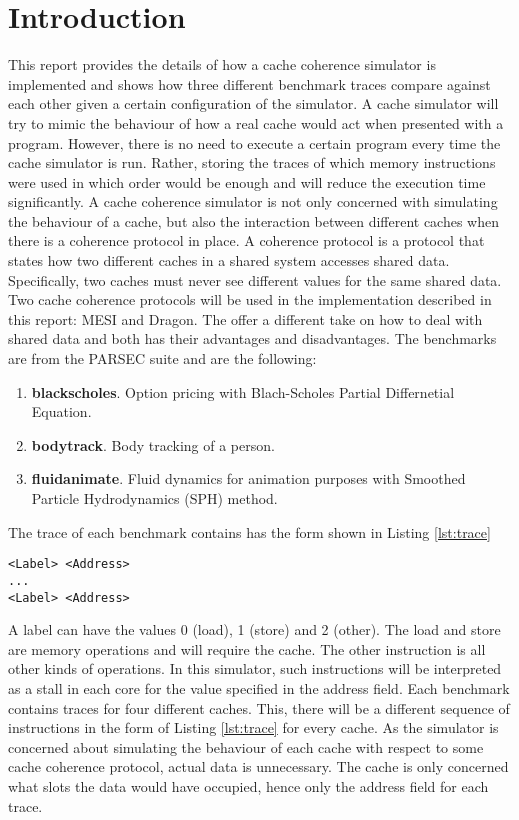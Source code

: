 \section{Introduction}

This report provides the details of how a cache coherence simulator is implemented and shows how three different benchmark traces compare against each other given a certain configuration of the simulator.
A cache simulator will try to mimic the behaviour of how a real cache would act when presented with a program.
However, there is no need to execute a certain program every time the cache simulator is run.
Rather, storing the traces of which memory instructions were used in which order would be enough and will reduce the execution time significantly. 
A cache coherence simulator is not only concerned with simulating the behaviour of a cache, but also the interaction between different caches when there is a coherence protocol in place.
A coherence protocol is a protocol that states how two different caches in a shared system accesses shared data. Specifically, two caches must never see different values for the same shared data.
Two cache coherence protocols will be used in the implementation described in this report: MESI and Dragon.
The offer a different take on how to deal with shared data and both has their advantages and disadvantages.
The benchmarks are from the PARSEC suite and are the following:
\begin{enumerate}
    \item \textbf{blackscholes}. Option pricing with Blach-Scholes Partial Differnetial Equation.
    \item \textbf{bodytrack}. Body tracking of a person.
    \item \textbf{fluidanimate}. Fluid dynamics for animation purposes with Smoothed Particle Hydrodynamics (SPH) method.
\end{enumerate}
The trace of each benchmark contains has the form shown in Listing \ref{lst:trace}

\begin{lstlisting}[label=lst:trace]
<Label> <Address>
...
<Label> <Address>
\end{lstlisting}
A label can have the values 0 (load), 1 (store) and 2 (other). The load and store are memory operations and will require the cache.
The other instruction is all other kinds of operations.
In this simulator, such instructions will be interpreted as a stall in each core for the value specified in the address field.
Each benchmark contains traces for four different caches.
This, there will be a different sequence of instructions in the form of Listing \ref{lst:trace} for every cache. 
As the simulator is concerned about simulating the behaviour of each cache with respect to some cache coherence protocol, actual data is unnecessary.
The cache is only concerned what slots the data would have occupied, hence only the address field for each trace.


